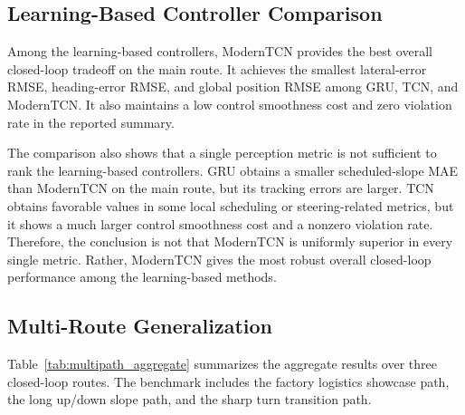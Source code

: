 \documentclass{ieeeaccess}
\begin{document}
\subsection{Learning-Based Controller Comparison}



Among the learning-based controllers, ModernTCN provides the best overall closed-loop tradeoff on the main route. It achieves the smallest lateral-error RMSE, heading-error RMSE, and global position RMSE among GRU, TCN, and ModernTCN. It also maintains a low control smoothness cost and zero violation rate in the reported summary.



The comparison also shows that a single perception metric is not sufficient to rank the learning-based controllers. GRU obtains a smaller scheduled-slope MAE than ModernTCN on the main route, but its tracking errors are larger. TCN obtains favorable values in some local scheduling or steering-related metrics, but it shows a much larger control smoothness cost and a nonzero violation rate. Therefore, the conclusion is not that ModernTCN is uniformly superior in every single metric. Rather, ModernTCN gives the most robust overall closed-loop performance among the learning-based methods.



\subsection{Multi-Route Generalization}



Table~\ref{tab:multipath_aggregate} summarizes the aggregate results over three closed-loop routes. The benchmark includes the factory logistics showcase path, the long up/down slope path, and the sharp turn transition path.
\end{document}
